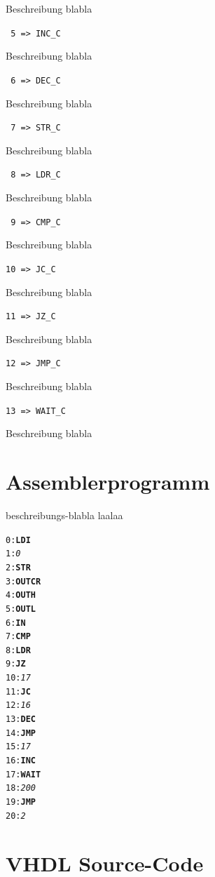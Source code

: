 \documentclass[a4paper,10pt]{scrartcl}
\begin{document}
Beschreibung blabla

\noindent\texttt{ 5  =>  INC\_C}

Beschreibung blabla

\noindent\texttt{ 6  =>  DEC\_C}

Beschreibung blabla

\noindent\texttt{ 7  =>  STR\_C}

Beschreibung blabla

\noindent\texttt{ 8  =>  LDR\_C}

Beschreibung blabla

\noindent\texttt{ 9  =>  CMP\_C}

Beschreibung blabla

\noindent\texttt{10  =>  JC\_C}

Beschreibung blabla

\noindent\texttt{11  =>  JZ\_C}

Beschreibung blabla

\noindent\texttt{12  =>  JMP\_C}

Beschreibung blabla

\noindent\texttt{13  =>  WAIT\_C}

Beschreibung blabla



\section{Assemblerprogramm}
\label{sec:ass_prog}


beschreibungs-blabla laalaa


\begin{alltt}\footnotesize
 0: \textbf{LDI }
 1: \textit{0}
 2: \textbf{STR}
 3: \textbf{OUTCR}
 4: \textbf{OUTH}
 5: \textbf{OUTL}
 6: \textbf{IN}
 7: \textbf{CMP}
 8: \textbf{LDR}
 9: \textbf{JZ }
10: \textit{17}
11: \textbf{JC }
12: \textit{16}
13: \textbf{DEC}
14: \textbf{JMP }
15: \textit{17}
16: \textbf{INC}
17: \textbf{WAIT }
18: \textit{200}
19: \textbf{JMP }
20: \textit{2}
\end{alltt}



\section{VHDL Source-Code}
\label{sec:vhdl}

\end{document}
